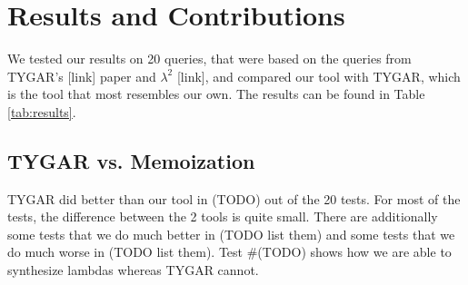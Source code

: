 \documentclass[acmsmall,nonacm]{acmart}
\begin{document}





\section{Results and Contributions}



We tested our results on 20 queries, that were based on the queries 
from TYGAR's [link] paper and ${\lambda^2}$ [link], and compared our tool with TYGAR, 
which is the tool that most resembles our own. The results can be found in 
Table \ref{tab:results}.



\subsection{TYGAR vs. Memoization}

TYGAR did better than our tool in (TODO) out of the 20 tests. 
For most of the tests, the difference between the 2 tools is quite small. There
are additionally some tests that we do much better in (TODO list them)
and some tests that we do much worse in (TODO list them).
Test \#(TODO) shows how we are able to synthesize lambdas whereas TYGAR cannot.
\end{document}
